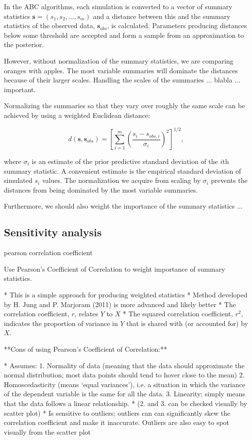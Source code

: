     
In the ABC algorithms, each simulation is converted to a vector of summary statistics $\mathbf{s} = (s_1, s_2, ..., s_m)$ and a distance between this and the summary statistics of the observed data, $\mathbf{s}_{obs}$, is calculated. Parameters producing distances below some threshold are accepted and form a sample from an approximation to the posterior. 

However, without normalization of the summary statistics, we are comparing oranges with apples. The most variable summaries will dominate the distances because of their larger scales. Handling the scales of the summaries ... blabla ... important.  

Normalizing the summaries so that they vary over roughly the same scale can be achieved by using a weighted Euclidean distance: 

$$ d \left(\mathbf{s}, \mathbf{s}_{obs} \right) = \left[ \sum_{i=1}^m \left( \frac{s_i - s_{obs, i}}{\sigma_i} \right)^2 \right]^{1/2},$$

where $\sigma_i$ is an estimate of the prior predictive standard deviation of the $i$th summary statistic. A convenient estimate is the empirical standard deviation of simulated $s_i$ values. The normalization we acquire from scaling by $\sigma_i$ prevents the distances from being dominated by the most variable summaries.  

Furthermore, we should also weight the importance of the summary statistics ...

\subsection{Sensitivity analysis} 

pearson correlation coefficient

Use Pearson's Coefficient of Correlation to weight importance of summary statistics.

* This is a simple approach for producing weighted statistics 
    * Method developed by H. Jung and P. Marjoram (2011) is more advanced and likely better
* The correlation coefficient, $r$, relates $Y$ to $X$ 
* The squared correlation coefficient, $r^2$, indicates the proportion of variance in $Y$ that is shared with (or accounted for) by $X$.

**Cons of using Pearson's Coefficient of Correlation:**

* Assumes:
    1. Normality of data (meaning that the data should approximate the normal distribution; most data points should tend to hover close to the mean)
    2. Homoscedasticity (means ‘equal variances’), i.e. a situation in which the variance of the dependent variable is the same for all the data.
    3. Linearity; simply means that the data follows a linear relationship. 
* (2. and 3. can be checked visually by scatter plot)
* Is sensitive to outliers; outliers can can significantly skew the correlation coefficient and make it inaccurate. Outliers are also easy to spot visually from the scatter plot

